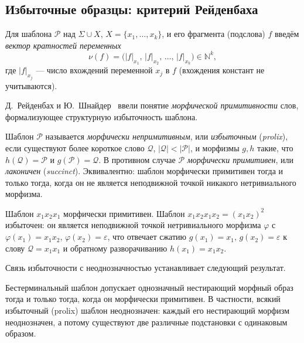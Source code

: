 \documentclass[14pt, russian]{scrartcl}
\begin{document}
\subsection{Избыточные образцы: критерий Рейденбаха}
\label{sec:reidenbach}

Для шаблона $\mathcal{P}$ над $\Sigma \cup X$, $X = \{x_1, \dots, x_k\}$, и его
фрагмента (подслова) $f$ введём \textit{вектор кратностей переменных}
\begin{equation}
\nu(f) = \bigl(|f|_{x_1},\, |f|_{x_2},\, \dots,\, |f|_{x_k}\bigr) \in \mathbb{N}^k,
\end{equation}
где $|f|_{x_j}$ --- число вхождений переменной $x_j$ в $f$ (вхождения констант не
учитываются).

Д.~Рейденбах и Ю.~Шнайдер~\cite{reidenbach2009} ввели понятие \textit{морфической
примитивности} слов, формализующее структурную избыточность шаблона.

\begin{Definition}
Шаблон $\mathcal{P}$ называется \textit{морфически непримитивным}, или
\textit{избыточным} (\textit{prolix}), если существуют более короткое слово
$\mathcal{Q}$, $|\mathcal{Q}| < |\mathcal{P}|$, и морфизмы $g, h$ такие, что
$h(\mathcal{Q}) = \mathcal{P}$ и $g(\mathcal{P}) = \mathcal{Q}$. В противном случае
$\mathcal{P}$ \textit{морфически примитивен}, или \textit{лаконичен} (\textit{succinct}). Эквивалентно:
шаблон морфически примитивен тогда и только тогда, когда он не является неподвижной
точкой никакого нетривиального морфизма.
\end{Definition}

\begin{Example}
Шаблон $x_1 x_2 x_1$ морфически примитивен. Шаблон $x_1 x_2 x_1 x_2 = (x_1 x_2)^2$
избыточен: он является неподвижной точкой нетривиального морфизма $\varphi$ с
$\varphi(x_1) = x_1 x_2$, $\varphi(x_2) = \varepsilon$, что отвечает сжатию
$g(x_1) = x_1,\, g(x_2) = \varepsilon$ к слову $\mathcal{Q} = x_1 x_1$ и обратному
разворачиванию $h(x_1) = x_1 x_2$.
\end{Example}

Связь избыточности с неоднозначностью устанавливает следующий результат.

\begin{Theorem}
\label{thm:reidenbach}
Бестерминальный шаблон допускает однозначный нестирающий морфный образ тогда и только
тогда, когда он морфически примитивен. В частности, всякий избыточный (prolix) шаблон
неоднозначен: каждый его нестирающий морфизм неоднозначен, а потому существуют две
различные подстановки с одинаковым образом.
\end{Theorem}
\end{document}

